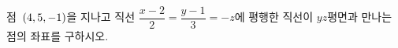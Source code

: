 점~$(4{,}\mkern3mu\mathopen{}5{,}\mkern3mu\mathopen{}-1)$을 지나고 직선 $\dfrac{x-2}{2}=\dfrac{y-1}{3}=-z$에 평행한 직선이 $yz$평면과 만나는 점의 좌표를 구하시오.
